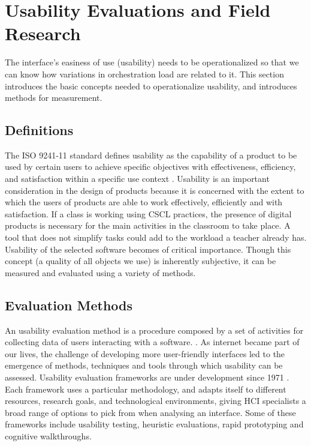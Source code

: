 \section{Usability Evaluations and Field Research} \label{soa_usability}
The interface's easiness of use (usability) needs to be operationalized so that we can know how variations in orchestration load are related to it. This section introduces the basic concepts needed to operationalize usability, and introduces methods for measurement.
\subsection{Definitions}
The ISO 9241-11 standard defines usability as the capability of a product to be used by certain users to achieve specific objectives with effectiveness, efficiency, and satisfaction within a specific use context \cite{noauthor_undated-ex}. Usability is an important consideration in the design of products because it is concerned with the extent to which the users of products are able to work effectively, efficiently and with satisfaction. If a class is working using CSCL practices, the presence of digital products is necessary for the main activities in the classroom to take place. A tool that does not simplify tasks could add to the workload a teacher already has. Usability of the selected software becomes of critical importance. Though this concept (a quality of all objects we use) is inherently subjective, it can be measured and evaluated using a variety of methods.
\subsection{Evaluation Methods}
An usability evaluation method is a procedure composed by a set of activities for collecting data of users interacting with a software. \cite{Fernandez2011-ln}. As internet became part of our lives, the challenge of developing more user-friendly interfaces led to the emergence of methods, techniques and tools through which usability can be assessed.
Usability evaluation frameworks are under development since 1971 \cite{Scholtz_undated-ip}. Each framework uses a particular methodology, and adapts itself to different resources, research goals, and technological environments, giving HCI specialists a broad range of options to pick from when analysing an interface. Some of these frameworks include usability testing, heuristic evaluations, rapid prototyping and cognitive walkthroughs.
